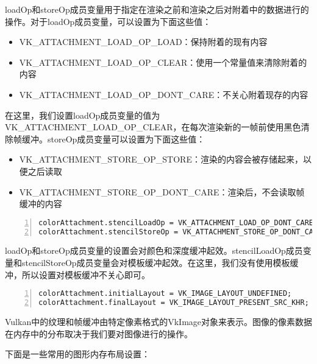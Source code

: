 \documentclass{ctexart}
\begin{document}
loadOp和storeOp成员变量用于指定在渲染之前和渲染之后对附着中的数据进行的操作。对于loadOp成员变量，可以设置为下面这些值：

\begin{itemize}
	\item VK\_ATTACHMENT\_LOAD\_OP\_LOAD：保持附着的现有内容
	\item VK\_ATTACHMENT\_LOAD\_OP\_CLEAR：使用一个常量值来清除附着的内容
	\item VK\_ATTACHMENT\_LOAD\_OP\_DONT\_CARE：不关心附着现存的内容
\end{itemize}

在这里，我们设置loadOp成员变量的值为VK\_ATTACHMENT\_LOAD\_OP\_CLEAR，在每次渲染新的一帧前使用黑色清除帧缓冲。storeOp成员变量可以设置为下面这些值：

\begin{itemize}
	\item VK\_ATTACHMENT\_STORE\_OP\_STORE：渲染的内容会被存储起来，以便之后读取
	\item VK\_ATTACHMENT\_STORE\_OP\_DONT\_CARE：渲染后，不会读取帧缓冲的内容
\end{itemize}

\begin{lstlisting}[language={[ANSI]C},keywordstyle=\color{blue!70},commentstyle=\color{red!50!green!50!blue!50},frame=shadowbox, rulesepcolor=\color{red!20!green!20!blue!20},basicstyle=\small,numbers=left, numberstyle=\tiny,breaklines=true]
colorAttachment.stencilLoadOp = VK_ATTACHMENT_LOAD_OP_DONT_CARE;
colorAttachment.stencilStoreOp = VK_ATTACHMENT_STORE_OP_DONT_CARE;
\end{lstlisting}

loadOp和storeOp成员变量的设置会对颜色和深度缓冲起效。stencilLoadOp成员变量和stencilStoreOp成员变量会对模板缓冲起效。在这里，我们没有使用模板缓冲，所以设置对模板缓冲不关心即可。

\begin{lstlisting}[language={[ANSI]C},keywordstyle=\color{blue!70},commentstyle=\color{red!50!green!50!blue!50},frame=shadowbox, rulesepcolor=\color{red!20!green!20!blue!20},basicstyle=\small,numbers=left, numberstyle=\tiny,breaklines=true]
colorAttachment.initialLayout = VK_IMAGE_LAYOUT_UNDEFINED;
colorAttachment.finalLayout = VK_IMAGE_LAYOUT_PRESENT_SRC_KHR;
\end{lstlisting}

Vulkan中的纹理和帧缓冲由特定像素格式的VkImage对象来表示。图像的像素数据在内存中的分布取决于我们要对图像进行的操作。

下面是一些常用的图形内存布局设置：
\end{document}
